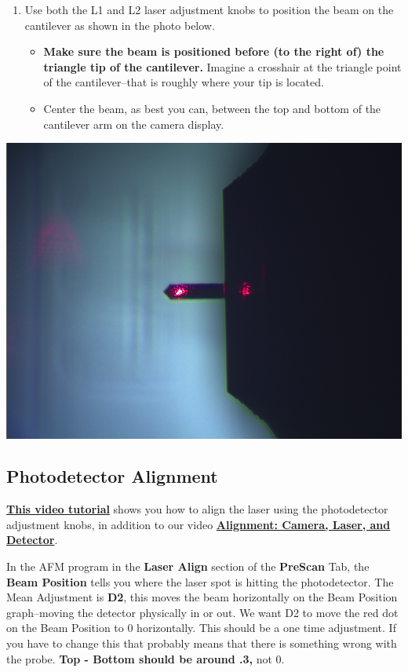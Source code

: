 \documentclass{../lab}
\begin{document}
\begin{enumerate}
    \item Use both the L1 and L2 laser adjustment knobs to position the beam on the cantilever as shown in the photo below.

    \begin{itemize}
        \item \textbf{Make sure the beam is positioned before (to the right of) the triangle tip of the cantilever. } Imagine a crosshair at the triangle point of the cantilever--that is roughly where your tip is located.

        \item Center the beam, as best you can, between the top and bottom of the cantilever arm on the camera display.

    \end{itemize}

\end{enumerate}


\begin{center}
    \href{http://experimentationlab.berkeley.edu/sites/default/files/AFMImages/laser_align.png}{\includegraphics[width=0.5\linewidth]{images/laser_align.png}}
\end{center}

\subsection{Photodetector Alignment}

\href{http://experimentationlab.berkeley.edu/sites/default/files/AFMImages/5.0\%20\%20Phtodetector\%20Alignment\%28V1.0\%29.wmv}{\textbf{This video tutorial}} shows you how to align the laser using the photodetector adjustment knobs, in addition to our video  \href{http://experimentationlab.berkeley.edu/sites/default/files/alignment\_final2.mp4}{\textbf{Alignment: Camera, Laser, and Detector}}.

In the AFM program in the\textbf{ Laser Align} section of the \textbf{PreScan} Tab, the \textbf{Beam Position} tells you where the laser spot is hitting the photodetector. The Mean Adjustment is \textbf{D2}, this moves the beam horizontally on the Beam Position graph--moving the detector physically in or out.  We want D2 to move the red dot on the Beam Position to 0 horizontally.  This should be a one time adjustment.  If you have to change this that probably means that there is something wrong with the probe. \textbf{Top - Bottom should be around .3, }not 0.
\end{document}
